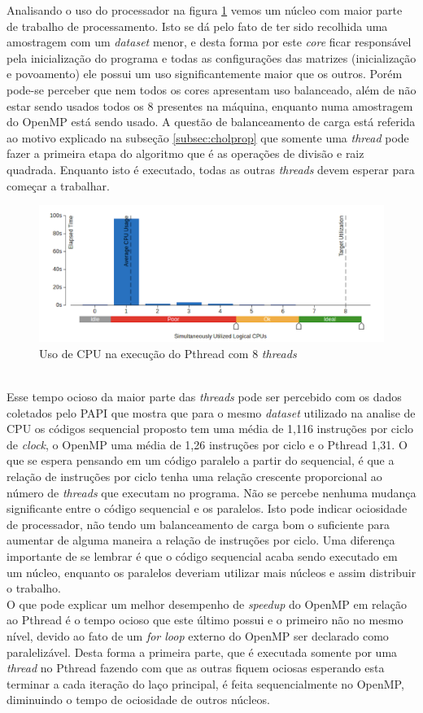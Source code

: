 \documentclass[12pt]{article}
\newcommand\tab[1][1cm]{\hspace*{#1}}
\begin{document}
\tab Analisando o uso do processador na figura \ref{fig:cpuinfo} vemos um núcleo com maior parte de trabalho de processamento. Isto se dá pelo fato de ter sido recolhida uma amostragem com um \textit{dataset} menor, e desta forma por este \textit{core} ficar responsável pela inicialização do programa e todas as configurações das matrizes (inicialização e povoamento) ele possui um uso significantemente maior que os outros. Porém pode-se perceber que nem todos os cores apresentam uso balanceado, além de não estar sendo usados todos os 8 presentes na máquina, enquanto numa amostragem do OpenMP está sendo usado. A questão de balanceamento de carga está referida ao motivo explicado na subseção \ref{subsec:cholprop} que somente uma \textit{thread} pode fazer a primeira etapa do algoritmo que é as operações de divisão e raiz quadrada. Enquanto isto é executado, todas as outras \textit{threads} devem esperar para começar a trabalhar. 
\begin{figure}[ht]
\centering
\includegraphics[width=.5\textwidth]{cpu_usage_pthread.png}
\caption{Uso de CPU na execução do Pthread com 8 \textit{threads}}
\label{fig:cpuinfo}
\end{figure}
\\
\tab Esse tempo ocioso da maior parte das \textit{threads} pode ser percebido com os dados coletados pelo PAPI que mostra que para o mesmo \textit{dataset} utilizado na analise de CPU os códigos sequencial  proposto tem uma média de 1,116 instruções por ciclo de \textit{clock}, o OpenMP uma média de 1,26 instruções por ciclo e o Pthread 1,31. O que se espera pensando em um código paralelo a partir do sequencial, é que a relação de instruções por ciclo tenha uma relação crescente proporcional ao número de \textit{threads} que executam no programa. Não se percebe nenhuma mudança significante entre o código sequencial e os paralelos. Isto pode indicar ociosidade de processador, não tendo um balanceamento de carga bom o suficiente para aumentar de alguma maneira a relação de instruções por ciclo.  Uma diferença importante de se lembrar é que o código sequencial acaba sendo executado em um núcleo, enquanto os paralelos deveriam utilizar mais núcleos e assim distribuir o trabalho.
\\
\tab O que pode explicar um melhor desempenho de \textit{speedup} do OpenMP em relação ao Pthread é o tempo ocioso que este último possui e o primeiro não no mesmo nível, devido ao fato de um \textit{for loop} externo do OpenMP ser declarado como paralelizável. Desta forma a primeira parte, que é executada somente por uma \textit{thread} no Pthread fazendo com que as outras fiquem ociosas esperando esta terminar a cada iteração do laço principal, é feita sequencialmente no OpenMP, diminuindo o tempo de ociosidade de outros núcleos.
\end{document}
